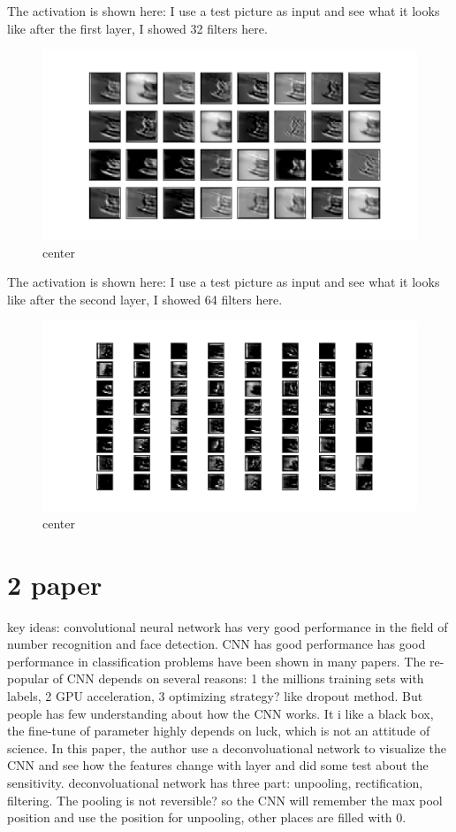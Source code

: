 \documentclass[12pt]{article}
\begin{document}
The activation is shown here: I use a test picture as input and see what it looks like after the first layer, I showed 32 filters here.
\begin{figure}[H]
  \caption{center}
  \centering
    \includegraphics[scale=1]{Figure1.png}
\end{figure}
The activation is shown here: I use a test picture as input and see what it looks like after the second layer, I showed 64 filters here.
\begin{figure}[H]
  \caption{center}
  \centering
    \includegraphics[scale=1]{Figure2.png}
\end{figure}



\section{2 paper}
key ideas:
convolutional neural network has very good performance in the field of number recognition and face detection. CNN has good performance has good performance in classification problems have been shown in many papers. The re-popular of CNN depends on several reasons: 1 the millions training sets with labels, 2 GPU acceleration, 3 optimizing strategy? like dropout method.
But people has few understanding about how the CNN works. It i like a black box, the fine-tune of parameter highly depends on luck, which is not an attitude of science.
In this paper, the author use a deconvoluational network to visualize the CNN and see how the features change with layer and did some test about the sensitivity. 
deconvoluational network has three part: unpooling, rectification, filtering. The pooling is not reversible? so the CNN will remember the max pool position and use the position for unpooling, other places are filled with 0.
\end{document}
